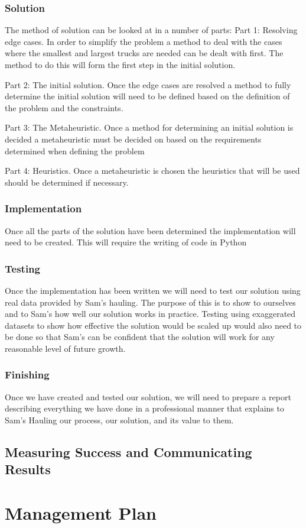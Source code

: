 \documentclass{article}
\begin{document}
\subsubsection{Solution}
The method of solution can be looked at in a number of parts:
Part 1: Resolving edge cases. 
In order to simplify the problem a method to deal with the cases where the smallest and largest trucks are needed can be dealt with first. The method to do this will form the first step in the initial solution.

Part 2: The initial solution.
Once the edge cases are resolved a method to fully determine the initial solution will need to be defined based on the definition of the problem and the constraints.

Part 3: The Metaheuristic.
Once a method for determining an initial solution is decided a metaheuristic must be decided on based on the requirements determined when defining the problem

Part 4: Heuristics.
Once a metaheuristic is chosen the heuristics that will be used should be determined if necessary.

\subsubsection{Implementation}
Once all the parts of the solution have been determined the implementation will need to be created. This will require the writing of code in Python

\subsubsection{Testing}
Once the implementation has been written we will need to test our solution using real data provided by Sam's hauling. The purpose of this is to show to ourselves and to Sam's how well our solution works in practice. Testing using exaggerated datasets to show how effective the solution would be scaled up would also need to be done so that Sam's can be confident that the solution will work for any reasonable level of future growth.

\subsubsection{Finishing}
Once we have created and tested our solution, we will need to prepare a report describing everything we have done in a professional manner that explains to Sam's Hauling our process, our solution, and its value to them.

\subsection{Measuring Success and Communicating Results}

\section{Management Plan}
\end{document}
